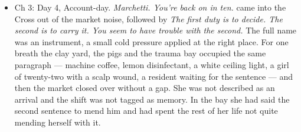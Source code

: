 \documentclass{design/chronicle}
\begin{document}
{\begin{itemize}[leftmargin=1.4em,itemsep=1pt,topsep=3pt,parsep=0pt]
\item Ch 3: Day 4, Account-day. \emph{Marchetti. You’re back on in ten.} came into the Cross out of the market noise, followed by \emph{The first duty is to decide. The second is to carry it. You seem to have trouble with the second.} The full name was an instrument, a small cold pressure applied at the right place. For one breath the clay yard, the pigs and the trauma bay occupied the same paragraph --- machine coffee, lemon disinfectant, a white ceiling light, a girl of twenty-two with a scalp wound, a resident waiting for the sentence --- and then the market closed over without a gap. She was not described as an arrival and the shift was not tagged as memory. In the bay she had said the second sentence to mend him and had spent the rest of her life not quite mending herself with it.

\end{itemize}
}
\end{document}
